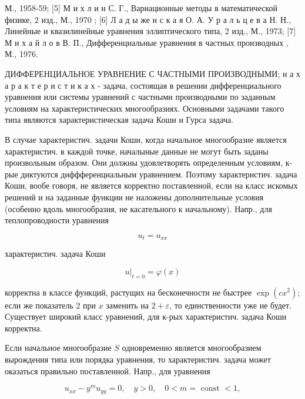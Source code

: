 \documentclass[10pt]{article}
\begin{document}
М., 1958-59; [5] М и х л и н С. Г., Вариационные методы в математической физике, 2 изд., М., 1970 ; [6] Л а д ы же н с к а я О. А. У р а л ь ц е в а Н. Н., Линейные и квазилинейные уравнения эллиптического типа, 2 изд., М., 1973; [7] М и х а й л о в В. П., Дифференциальные уравнения в частных производных , М., 1976.



ДИФФЕРЕНЦИАЛЬНОЕ УРАВНЕНИЕ С ЧАСТНЬІМИ ПРОИЗВОДНЫМИ; н а х а р а к т е р и с т и к а х - задача, состоящая в решении дифференциального уравнения или системы уравнений с частными производными по заданным условиям на характеристических многообразиях. Основными задачами такого типа являются характеристическая задача Коши и Гурса задача.



В случае характеристич. задачи Коши, когда начальное многообразие является характеристич. в каждой точке, началыные данные не могут быть заданы произвольным образом. Они должны удовлетворять определенным условиям, к-рые диктуются диффференциальным уравнением. Поэтому характеристич. задача Коши, вообе говоря, не является корректно поставленной, если на класс искомых решений и на заданные функции не наложены дополнительные условия (особенно вдоль многообразия, не касательного к начальному). Напр., для теплопроводности уравнения



\[

u_{t}=u_{x x}

\]



характеристич. задача Коши



\[

\left.u\right|_{t=0}=\varphi(x)

\]



корректна в классе функций, растущих на бесконечности не быстрее $\exp \left(c x^{2}\right)$; если же показатель 2 при $x$ заменить на $2+\varepsilon$, то единственности уже не будет. Существует широкий класс уравнений, для к-рых характеристич. задача Коши корректна.



Если начальное многообразие $S$ одновременно является многообразием вырождения типа или порядка уравнения, то характеристич. задача может оказаться правильно поставленной. Напр., для уравнения



\[

u_{x x}-y^{m} u_{y y}=0, \quad y>0, \quad 0<m=\text { const }<1,

\]
\end{document}
